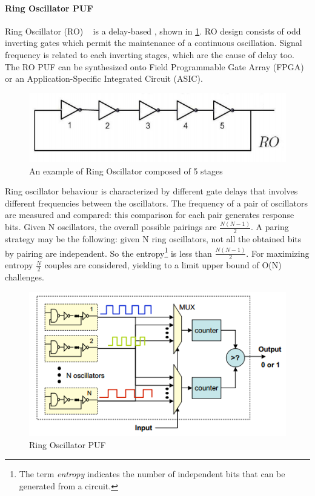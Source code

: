 \documentclass[../tesi.tex]{subfiles}
\begin{document}
\paragraph{Ring Oscillator PUF} \label{par:ropuf}
Ring Oscillator (RO) ~\cite{suh2007physical} is a delay-based \puf{}, shown in \ref{fig:ringoscillator}. RO design consists of odd inverting gates which permit the maintenance of a continuous oscillation. Signal frequency is related to each inverting stages, which are the cause of delay too. The RO PUF can be synthesized onto Field Programmable Gate Array (FPGA) or an Application-Specific Integrated Circuit (ASIC). 
\begin{figure}
\centering
\includegraphics[scale=0.40]{images/ringoscillator.png}
\caption{An example of Ring Oscillator composed of 5 stages}
\label{fig:ringoscillator}
\end{figure}
Ring oscillator behaviour is characterized by different gate delays that involves different frequencies between the oscillators. The frequency of a pair of oscillators are measured and compared: this comparison for each pair generates \puf{} response bits. Given N oscillators, the overall possible pairings are $\frac{N(N-1)}{2}$. A paring strategy may be the following: given N ring oscillators, not all the obtained bits by pairing  are independent. So the entropy\footnote{The term \emph{entropy} indicates the number of independent bits that can be generated from a circuit.} is less than $\frac{N(N-1)}{2}$. For maximizing entropy $\frac{N}{2}$ couples are considered, yielding to a limit upper bound of O(N) challenges.
\begin{figure}
\centering
\includegraphics[scale=0.60]{images/ringoscillatorpuf.png}
\caption{Ring Oscillator PUF}
\label{fig:ringoscillatorpuf}
\end{figure}
\end{document}
